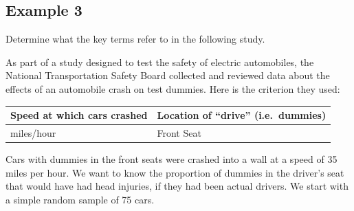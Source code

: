 \documentclass[
  letterpaper,
  DIV=11,
  numbers=noendperiod]{scrreprt}
\begin{document}
\subsection{Example 3}\label{example-3}

\begin{tcolorbox}[enhanced jigsaw, colframe=quarto-callout-note-color-frame, bottomtitle=1mm, colbacktitle=quarto-callout-note-color!10!white, bottomrule=.15mm, toprule=.15mm, breakable, leftrule=.75mm, left=2mm, rightrule=.15mm, colback=white, opacityback=0, opacitybacktitle=0.6, toptitle=1mm, titlerule=0mm, title=\textcolor{quarto-callout-note-color}{\faInfo}\hspace{0.5em}{Problem}, arc=.35mm, coltitle=black]

Determine what the key terms refer to in the following study.

As part of a study designed to test the safety of electric automobiles,
the National Transportation Safety Board collected and reviewed data
about the effects of an automobile crash on test dummies. Here is the
criterion they used:

\begin{longtable}[]{@{}ll@{}}
\toprule\noalign{}
Speed at which cars crashed & Location of ``drive'' (i.e.~dummies) \\
\midrule\noalign{}
\endhead
\bottomrule\noalign{}
\endlastfoot
35 miles/hour & Front Seat \\
\end{longtable}

Cars with dummies in the front seats were crashed into a wall at a speed
of 35 miles per hour. We want to know the proportion of dummies in the
driver's seat that would have had head injuries, if they had been actual
drivers. We start with a simple random sample of 75 cars.

\end{tcolorbox}
\end{document}
